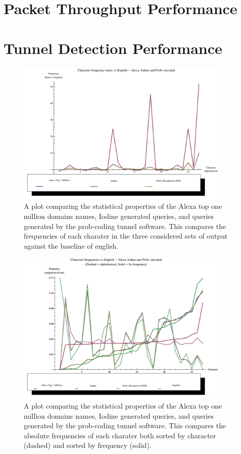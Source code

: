 \documentclass[12pt]{report}
\theoremstyle{remark}
\theoremstyle{definition}
\theoremstyle{definition}
\theoremstyle{definition}
\begin{document}
\section{Packet Throughput Performance}
\section{Tunnel Detection Performance}

\begin{figure}
\centering
\includegraphics[width=4in]{figures/alexa_iodine_prob_v_english-r.pdf}
\caption[DNS Query, Iodine and Prob-coded Comparison - Ratio]{A plot comparing the statistical properties of the Alexa top one million domains names, Iodine generated queries, and queries generated by the prob-coding tunnel software. This compares the frequencies of each charater in the three considered sets of output against the baseline of english.}
\label{FIGURE_alexa-iodine-prob-v-english-r}
\end{figure}

\begin{figure}
\centering
\includegraphics[width=4in]{figures/alexa_iodine_prob_v_english-a.pdf}
\caption[DNS Query, Iodine and Prob-coded Comparison - Absolute]{A plot comparing the statistical properties of the Alexa top one million domains names, Iodine generated queries, and queries generated by the prob-coding tunnel software. This compares the absolute frequencies of each charater both sorted by character (dashed) and sorted by frequency (solid).}
\label{FIGURE_alexa-iodine-prob-v-english-a}
\end{figure}
\end{document}
